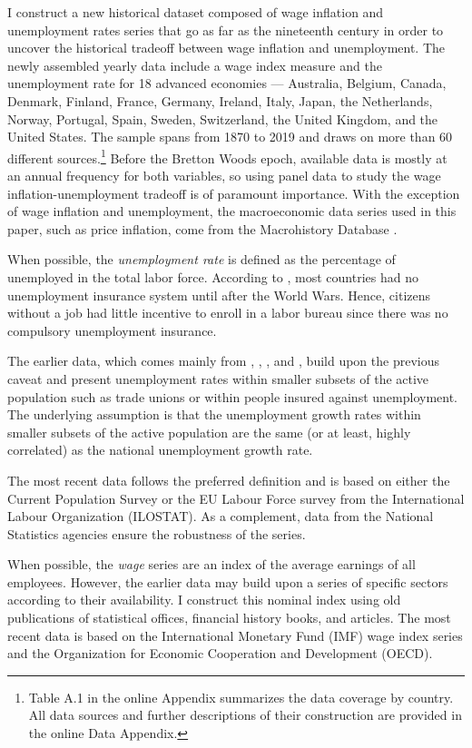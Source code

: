 \documentclass[12pt]{article}
\begin{document}
I construct a new historical dataset composed of wage inflation and unemployment rates series that go as far as the nineteenth century in order to uncover the historical tradeoff between wage inflation and unemployment. The newly assembled yearly data include a wage index measure and the unemployment rate for 18 advanced economies — Australia, Belgium, Canada, Denmark, Finland, France, Germany, Ireland, Italy, Japan, the Netherlands, Norway, Portugal, Spain, Sweden, Switzerland, the United Kingdom, and the United States. The sample spans from 1870 to 2019 and draws on more than 60 different sources.\footnote{Table A.1 in the online Appendix summarizes the data coverage by country. All data sources and further descriptions of their construction are provided in the online Data Appendix.} Before the Bretton Woods epoch, available data is mostly at an annual frequency for both variables, so using panel data to study the wage inflation-unemployment tradeoff is of paramount importance. With the exception of wage inflation and unemployment, the macroeconomic data series used in this paper, such as price inflation, come from the Macrohistory Database \citep{Jorda2017}.

When possible, the \textit{unemployment rate} is defined as the percentage of unemployed in the total labor force. According to \cite{Rasmussen2018}, most countries had no unemployment insurance system until after the World Wars. Hence, citizens without a job had little incentive to enroll in a labor bureau since there was no compulsory unemployment insurance. 

The earlier data, which comes mainly from \cite{Mitchell2013}, \cite{Tabin2013}, \cite{Maddison1982}, and \cite{Galenson1957}, build upon the previous caveat and present unemployment rates within smaller subsets of the active population such as trade unions or within people insured against unemployment. The underlying assumption is that the unemployment growth rates within smaller subsets of the active population are the same (or at least, highly correlated) as the national unemployment growth rate.

The most recent data follows the preferred definition and is based on either the Current Population Survey or the EU Labour Force survey from the International Labour Organization (ILOSTAT). As a complement, data from the National Statistics agencies ensure the robustness of the series.

When possible, the \textit{wage} series are an index of the average earnings of all employees. However, the earlier data may build upon a series of specific sectors according to their availability. I construct this nominal index using old publications of statistical offices, financial history books, and articles. The most recent data is based on the International Monetary Fund (IMF) wage index series and the Organization for Economic Cooperation and Development (OECD).
\end{document}
